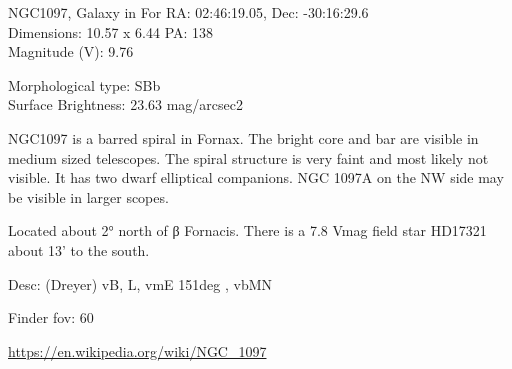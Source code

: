 \begin{block}{NGC1097, Galaxy in For}
    RA: 02:46:19.05, Dec: -30:16:29.6 \\ 
    Dimensions: 10.57 x 6.44 PA: 138 \\ 
    Magnitude (V): 9.76

    Morphological type: SBb \\ 
    Surface Brightness: 23.63 mag/arcsec2 

    NGC1097 is a barred spiral in Fornax. The bright core and bar are visible
    in medium sized telescopes. The spiral structure is very faint and most
    likely not visible.  It has two dwarf elliptical companions. NGC 1097A on
    the NW side may be visible in larger scopes.

    Located about 2° north of β Fornacis. There is a 7.8 Vmag field star
    HD17321 about 13' to the south.

    Desc: (Dreyer) vB, L, vmE 151deg , vbMN 

    Finder fov: 60 

    \url{https://en.wikipedia.org/wiki/NGC_1097} 
\end{block}
